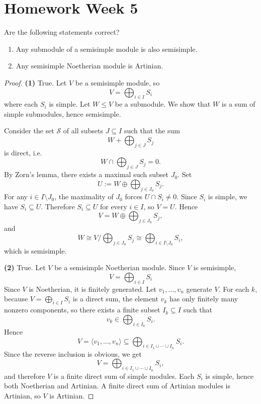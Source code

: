 \section{Homework Week 5}

\begin{exercise}
    Are the following statements correct?
    \begin{enumerate}
        \renewcommand{\labelenumi}{(\theenumi)}
        \item Any submodule of a semisimple module is also semisimple.
        \item Any semisimple Noetherian module is Artinian.
    \end{enumerate}
\end{exercise}

\begin{proof}
    \textbf{(1)} True. Let $V$ be a semisimple module, so
    \[
        V=\bigoplus_{i\in I} S_i
    \]
    where each $S_i$ is simple. Let $W\leq V$ be a submodule. We show that $W$ is a sum of simple submodules, hence semisimple.

    Consider the set $\mathcal{S}$ of all subsets $J\subseteq I$ such that the sum
    \[
        W+\bigoplus_{j\in J}S_j
    \]
    is direct, i.e.
    \[
        W\cap \bigoplus_{j\in J}S_j=0.
    \]
    By Zorn's lemma, there exists a maximal such subset $J_0$. Set
    \[
        U:=W\oplus \bigoplus_{j\in J_0}S_j.
    \]
    For any $i\in I\setminus J_0$, the maximality of $J_0$ forces $U\cap S_i\neq 0$. Since $S_i$ is simple, we have $S_i\subseteq U$. Therefore $S_i\subseteq U$ for every $i\in I$, so $V=U$. Hence
    \[
        V=W\oplus \bigoplus_{j\in J_0}S_j,
    \]
    and
    \[
        W\cong V\Big/\bigoplus_{j\in J_0}S_j \cong \bigoplus_{i\in I\setminus J_0} S_i,
    \]
    which is semisimple.

    \medskip
    \textbf{(2)} True. Let $V$ be a semisimple Noetherian module. Since $V$ is semisimple,
    \[
        V=\bigoplus_{i\in I}S_i
    \]
    Since $V$ is Noetherian, it is finitely generated. Let $v_1,\dots,v_n$ generate $V$.
    For each $k$, because $V=\bigoplus_{i\in I} S_i$ is a direct sum, the element $v_k$ has only finitely many nonzero components, so there exists a finite subset $I_k\subseteq I$ such that
    \[
        v_k\in \bigoplus_{i\in I_k} S_i.
    \]
    Hence
    \[
        V=\langle v_1,\dots,v_n\rangle \subseteq \bigoplus_{i\in I_1\cup\cdots\cup I_n} S_i.
    \]
    Since the reverse inclusion is obvious, we get
    \[
        V=\bigoplus_{i\in I_1\cup\cdots\cup I_n} S_i,
    \]
    and therefore $V$ is a finite direct sum of simple modules. Each $S_i$ is simple, hence both Noetherian and Artinian. A finite direct sum of Artinian modules is Artinian, so $V$ is Artinian.
\end{proof}


